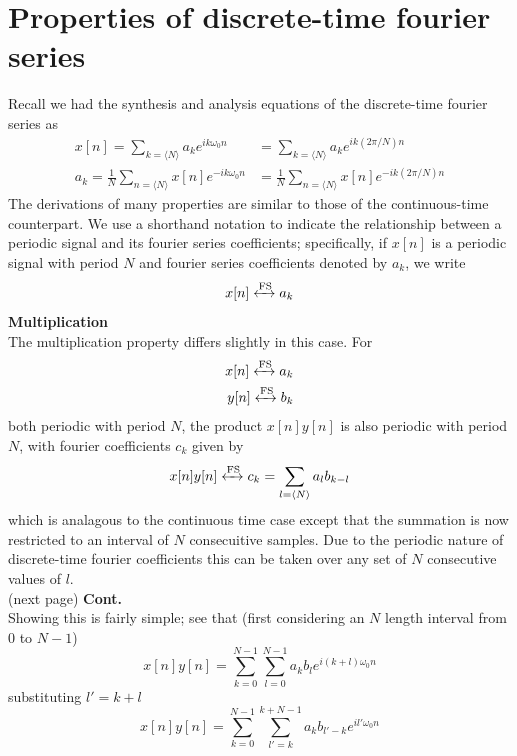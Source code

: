 \documentclass{report}
\begin{document}
\section{Properties of discrete-time fourier series}
Recall we had the synthesis and analysis equations of the discrete-time fourier series as
\begin{align*}
x[n]=\sum_{k=\langle N\rangle}a_ke^{ik\omega_0n}&=\sum_{k=\langle N\rangle}a_ke^{ik(2\pi/N)n}\\
a_k=\frac{1}{N}\sum_{n=\langle N\rangle}x[n]e^{-ik\omega_0n}&=
\frac{1}{N}\sum_{n=\langle N\rangle}x[n]e^{-ik(2\pi/N)n}
\end{align*}
The derivations of many properties are similar to those of the continuous-time counterpart. We use a shorthand notation to indicate the relationship between a periodic signal and its fourier
series coefficients; specifically, if $x[n]$ is a periodic signal with period $N$ and fourier series coefficients denoted by $a_k$, we write
\begin{equation*}
x[n]\xleftrightarrow[]{\text{FS}}a_k
\end{equation*}
\textbf{Multiplication}\\
The multiplication property differs slightly in this case. For 
\begin{align*}
x[n]\xleftrightarrow[]{\text{FS}}a_k\\
y[n]\xleftrightarrow[]{\text{FS}}b_k
\end{align*}
both periodic with period $N$, the product $x[n]y[n]$ is also periodic with period $N$, with fourier coefficients $c_k$ given by
\begin{equation*}
x[n]y[n]\xleftrightarrow[]{\text{FS}}c_k=\sum_{l=\langle N\rangle}a_lb_{k-l}
\end{equation*}
which is analagous to the continuous time case except that the summation is now restricted to an interval of $N$ consecuitive samples. Due to the periodic nature of discrete-time fourier coefficients
this can be taken over any set of $N$ consecutive values of $l$.\\
(next page)\newpage
\noindent\textbf{Cont.}\\
Showing this is fairly simple; see that (first considering an $N$ length interval from 0 to $N-1$)
\begin{equation*}
x[n]y[n]=\sum^{N-1}_{k=0}\sum^{N-1}_{l=0}a_kb_le^{i(k+l)\omega_0n}
\end{equation*}
substituting $l'=k+l$
\begin{equation*}
x[n]y[n]=\sum^{N-1}_{k=0}\sum^{k+N-1}_{l'=k}a_kb_{l'-k}e^{il'\omega_0n}
\end{equation*}
\end{document}

